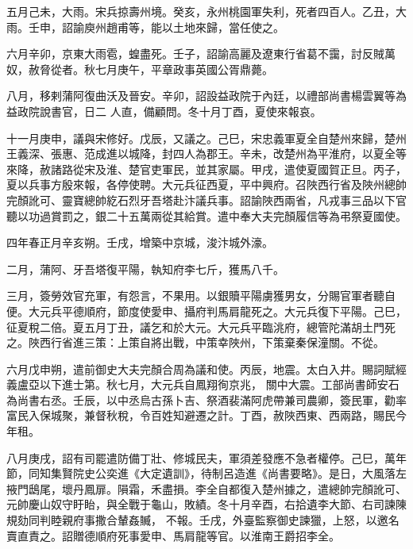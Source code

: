 \begin{pinyinscope}
 五月己未，大雨。宋兵掠壽州境。癸亥，永州桃園軍失利，死者四百人。乙丑，大雨。壬申，詔諭庾州趙甫等，能以土地來歸，當任使之。



 六月辛卯，京東大雨雹，蝗盡死。壬子，詔諭高麗及遼東行省葛不靄，討反賊萬奴，赦脅從者。秋七月庚午，平章政事英國公胥鼎薨。



 八月，移剌蒲阿復曲沃及晉安。辛卯，詔設益政院于內廷，以禮部尚書楊雲翼等為益政院說書官，日二
 人直，備顧問。冬十月丁酉，夏使來報哀。



 十一月庚申，議與宋修好。戊辰，又議之。己巳，宋忠義軍夏全自楚州來歸，楚州王義深、張惠、范成進以城降，封四人為郡王。辛未，改楚州為平淮府，以夏全等來降，赦諸路從宋及淮、楚官吏軍民，並其家屬。甲戌，遣使夏國賀正旦。丙子，夏以兵事方殷來報，各停使聘。大元兵征西夏，平中興府。召陜西行省及陜州總帥完顏訛可、靈寶總帥紇石烈牙吾塔赴汴議兵事。詔諭陜西兩省，凡戎事三品以下官聽以功過賞罰之，銀二十五萬兩從其給賞。遣中奉大夫完顏履信等為弔祭夏國使。



 四年春正月辛亥朔。壬戌，增築中京城，浚汴城外濠。



 二月，蒲阿、牙吾塔復平陽，執知府李七斤，獲馬八千。



 三月，簽勞效官充軍，有怨言，不果用。以銀贖平陽虜獲男女，分賜官軍者聽自便。大元兵平德順府，節度使愛申、攝府判馬肩龍死之。大元兵復下平陽。己巳，征夏稅二倍。夏五月丁丑，議乞和於大元。大元兵平臨洮府，總管陀滿胡土門死之。陜西行省進三策：上策自將出戰，中策幸陜州，下策棄秦保潼關。不從。



 六月戊申朔，遣前御史大夫完顏合周為議和使。丙辰，地震。太白入井。賜詞賦經義盧亞以下進士第。秋七月，大元兵自鳳翔徇京兆，
 關中大震。工部尚書師安石為尚書右丞。壬辰，以中丞烏古孫卜吉、祭酒裴滿阿虎帶兼司農卿，簽民軍，勸率富民入保城聚，兼督秋稅，令百姓知避遷之計。丁酉，赦陜西東、西兩路，賜民今年租。



 八月庚戌，詔有司罷遣防備丁壯、修城民夫，軍須差發應不急者權停。己巳，萬年節，同知集賢院史公奕進《大定遺訓》，待制呂造進《尚書要略》。是日，大風落左掖門鴟尾，壞丹鳳扉。隕霜，禾盡損。李全自都復入楚州據之，遣總帥完顏訛可、元帥慶山奴守盱眙，與全戰于龜山，敗績。冬十月辛酉，右拾遺李大節、右司諫陳規劾同判睦親府事撒合輦姦贓，
 不報。壬戌，外臺監察御史諫獵，上怒，以邀名賣直責之。詔贈德順府死事愛申、馬肩龍等官。以淮南王爵招李全。




\end{pinyinscope}
